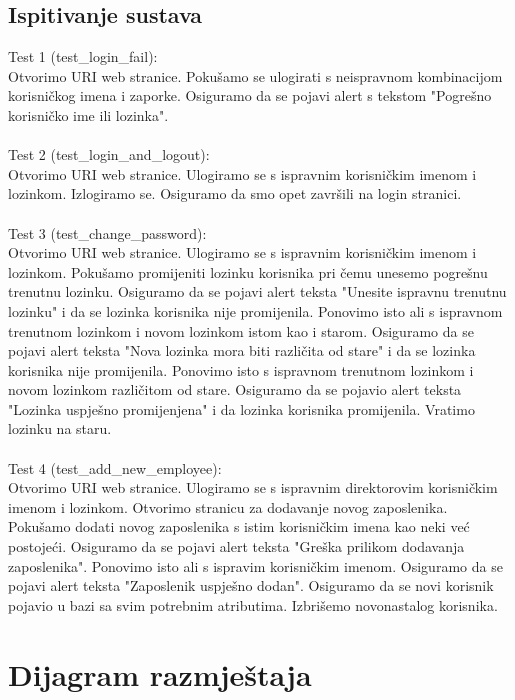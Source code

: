 			
			\subsection{Ispitivanje sustava}
			
			Test 1 (test\_login\_fail):\\
			Otvorimo URI web stranice. Pokušamo se ulogirati s neispravnom kombinacijom korisničkog imena i zaporke.
			Osiguramo da se pojavi alert s tekstom "Pogrešno korisničko ime ili lozinka".\\
			\\
			Test 2 (test\_login\_and\_logout):\\
			Otvorimo URI web stranice. Ulogiramo se s ispravnim korisničkim imenom i lozinkom. Izlogiramo se.
			Osiguramo da smo opet završili na login stranici.\\
			\\
			Test 3 (test\_change\_password):\\
			Otvorimo URI web stranice. Ulogiramo se s ispravnim korisničkim imenom i lozinkom. Pokušamo promijeniti
			lozinku korisnika pri čemu unesemo pogrešnu trenutnu lozinku. Osiguramo da se pojavi alert teksta
			"Unesite ispravnu trenutnu lozinku" i da se lozinka korisnika nije promijenila. Ponovimo isto ali s
			ispravnom trenutnom lozinkom i novom lozinkom istom kao i starom. Osiguramo da se pojavi alert teksta
			"Nova lozinka mora biti različita od stare" i da se lozinka korisnika nije promijenila. Ponovimo isto s
			ispravnom trenutnom lozinkom i novom lozinkom različitom od stare. Osiguramo da se pojavio alert teksta
			"Lozinka uspješno promijenjena" i da lozinka korisnika promijenila. Vratimo lozinku na staru.\\
			\\
			Test 4 (test\_add\_new\_employee):\\
			Otvorimo URI web stranice. Ulogiramo se s ispravnim direktorovim korisničkim imenom i lozinkom.
			Otvorimo stranicu za dodavanje novog zaposlenika. Pokušamo dodati novog zaposlenika s istim korisničkim
			imena kao neki već postojeći. Osiguramo da se pojavi alert teksta "Greška prilikom dodavanja zaposlenika".
			Ponovimo isto ali s ispravim korisničkim imenom. Osiguramo da se pojavi alert teksta "Zaposlenik uspješno
			dodan". Osiguramo da se novi korisnik pojavio u bazi sa svim potrebnim atributima. Izbrišemo novonastalog
			korisnika.
			
			\eject 
		
		
		\section{Dijagram razmještaja}
			
